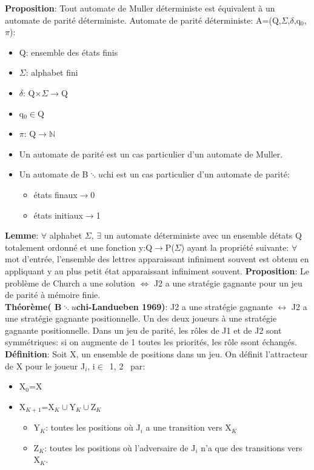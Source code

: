 \medskip
\textbf{Proposition}: Tout automate de Muller d\'eterministe est \'equivalent \`a un automate de parit\'e
d\'eterministe.
\medskip
Automate de parit\'e d\'eterministe: A=(Q,$\Sigma$,$\delta$,q$_0$,$\pi$):
\begin{itemize}
  \item Q: ensemble des \'etats finis
  \item $\Sigma$: alphabet fini
  \item $\delta$: Q$\times\Sigma\rightarrow$Q
  \item q$_0\in$Q
  \item $\pi$: Q$\rightarrow\mathbb{N}$
\end{itemize}
\begin{itemize}
  \item Un automate de parit\'e est un cas particulier d'un automate de Muller.
  \item Un automate de B$\ddots{u}$chi est un cas particulier d'un automate de parit\'e:
  \begin{itemize}
    \item \'etats finaux$\rightarrow$0
    \item \'etats initiaux$\rightarrow$1
  \end{itemize}
\end{itemize}
\medskip
\textbf{Lemme}: $\forall$ alphabet $\Sigma$, $\exists$ un automate d\'eterministe avec un ensemble d\'etats Q
totalement ordonn\'e et une fonction y:Q$\rightarrow$P($\Sigma$) ayant la propri\'et\'e suivante: $\forall$ mot
d'entr\'ee, l'ensemble des lettres apparaissant infiniment souvent est obtenu en appliquant y au plus petit \'etat
apparaissant infiniment souvent.
\medskip
\textbf{Proposition}: Le probl\`eme de Church a une solution $\Leftrightarrow$ J2 a une strat\'egie
gagnante pour un jeu de parit\'e \`a m\'emoire finie.\\
\textbf{Th\'eor\`eme( B$\ddots{u}$chi-Landueben 1969)}: J2 a une strat\'egie gagnante $\leftrightarrow$ J2 a une
strat\'egie gagnante positionnelle. Un des deux joueurs \`a une strat\'egie gagnante positionnelle.
\medskip
Dans un jeu de parit\'e, les r\^oles de J1 et de J2 sont symm\'etriques: si on augmente de 1 toutes les priorit\'es, les
r\^ole ssont \'echang\'es.\\
\textbf{D\'efinition}: Soit X, un ensemble de positions dans un jeu. On d\'efinit l'attracteur de X pour le joueur
J$_i$, i$\in${ \,1, 2} \, par:
\begin{itemize}
  \item X$_0$=X
  \item X$_{K+1}$=X$_K\cup$Y$_K\cup$Z$_K$
  \begin{itemize}
    \item Y$_K$: toutes les positions o\`u J$_i$ a une transition vers X$_K$
    \item Z$_K$: toutes les positions o\`u l'adversaire de J$_i$ n'a que des transitions vers X$_K$.
  \end{itemize}
\end{itemize}
